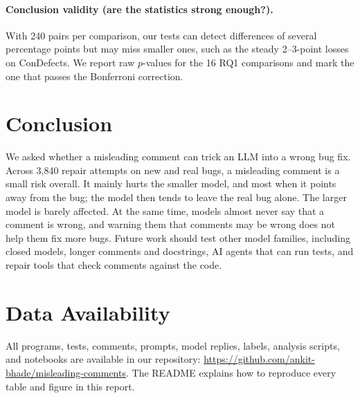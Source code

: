 \documentclass[sigconf,nonacm]{acmart}
\newcommand{\cd}{ConDefects}
\begin{document}
\paragraph{Conclusion validity (are the statistics strong enough?).} With 240 pairs per comparison, our tests can detect differences of several percentage points but may miss smaller ones, such as the steady 2--3-point losses on \cd{}. We report raw $p$-values for the 16 RQ1 comparisons and mark the one that passes the Bonferroni correction.

\section{Conclusion}
We asked whether a misleading comment can trick an LLM into a wrong bug fix. Across 3,840 repair attempts on new and real bugs, a misleading comment is a small risk overall. It mainly hurts the smaller model, and most when it points away from the bug; the model then tends to leave the real bug alone. The larger model is barely affected. At the same time, models almost never say that a comment is wrong, and warning them that comments may be wrong does not help them fix more bugs. Future work should test other model families, including closed models, longer comments and docstrings, AI agents that can run tests, and repair tools that check comments against the code.

\section*{Data Availability}
All programs, tests, comments, prompts, model replies, labels, analysis scripts, and notebooks are available in our repository: \url{https://github.com/ankit-bhade/misleading-comments}. The README explains how to reproduce every table and figure in this report.



\end{document}
